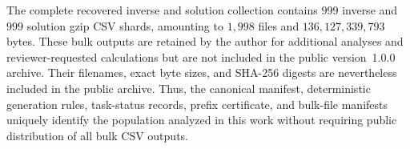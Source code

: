 \documentclass[supplement,review,onefignum,onetabnum]{siamart251216}
\begin{document}
The complete recovered inverse and solution collection contains $999$ inverse
and $999$ solution gzip CSV shards, amounting to $1{,}998$ files and
$136{,}127{,}339{,}793$ bytes. These bulk outputs are retained by the author
for additional analyses and reviewer-requested calculations but are not
included in the public version~1.0.0 archive. Their filenames, exact byte
sizes, and SHA-256 digests are nevertheless included in the public archive.
Thus, the canonical manifest, deterministic generation rules, task-status
records, prefix certificate, and bulk-file manifests uniquely identify the
population analyzed in this work without requiring public distribution of all
bulk CSV outputs.



\end{document}
